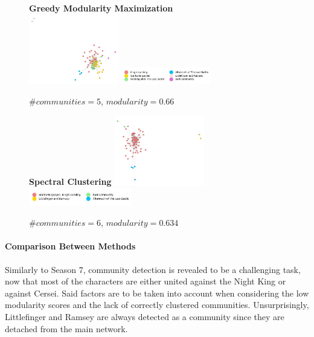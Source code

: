 \documentclass[10pt,twocolumn,letterpaper]{article}
\begin{document}
\begin{figure}[!h]
    \centering
    \textbf{Greedy Modularity Maximization}\\
    \includegraphics[width=0.35\textwidth]{img/s8/communities_gmm.jpg}
    \includegraphics[width=0.35\textwidth]{img/s8/gmm_legend.jpg}\\
    \caption{\small{$\#communities=5$, $modularity=0.66$}}
    \label{fig:gmm_s8}
\end{figure}

\begin{figure}[!h]
    \centering
    \textbf{Spectral Clustering}
    \includegraphics[width=0.35\textwidth]{img/s8/communities_sc.jpg}
    \includegraphics[width=0.4\textwidth]{img/s8/sc_legend.jpg}\\
    \caption{\small{$\#communities=6$, $modularity=0.634$}}
    \label{fig:sc_s8}
\end{figure}


\paragraph{Comparison Between Methods}

Similarly to Season 7, community detection is revealed to be a challenging task, now that most of the characters are either united against the Night King or against Cersei. Said factors are to be taken into account when considering the low modularity scores and the lack of correctly clustered communities. Unsurprisingly, Littlefinger and Ramsey are always detected as a community since they are detached from the main network. 
\end{document}
